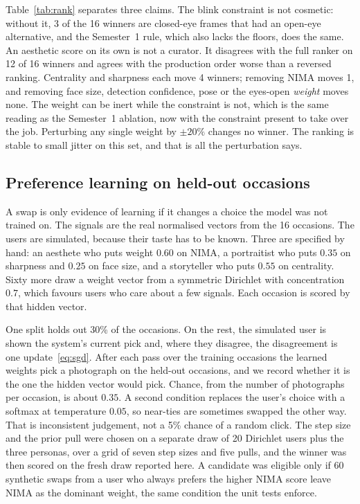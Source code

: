 \documentclass[conference]{IEEEtran}
\begin{document}
Table~\ref{tab:rank} separates three claims. The blink constraint is not
cosmetic: without it, 3 of the 16 winners are closed-eye frames that had an
open-eye alternative, and the Semester~1 rule, which also lacks the floors,
does the same. An aesthetic score on its own is not a curator. It disagrees
with the full ranker on 12 of 16 winners and agrees with the production order
worse than a reversed ranking. Centrality and sharpness each move 4 winners;
removing NIMA moves 1, and removing face size, detection confidence, pose or
the eyes-open \emph{weight} moves none. The weight can be inert while the
constraint is not, which is the same reading as the Semester~1 ablation, now
with the constraint present to take over the job. Perturbing any single weight
by $\pm 20\%$ changes no winner. The ranking is stable to small jitter on this
set, and that is all the perturbation says.

\subsection{Preference learning on held-out occasions}
\label{sec:pref-eval}

A swap is only evidence of learning if it changes a choice the model was not
trained on. The signals are the real normalised vectors from the 16 occasions.
The users are simulated, because their taste has to be known. Three are
specified by hand: an aesthete who puts weight $0.60$ on NIMA, a portraitist
who puts $0.35$ on sharpness and $0.25$ on face size, and a storyteller who
puts $0.55$ on centrality. Sixty more draw a weight vector from a symmetric
Dirichlet with concentration $0.7$, which favours users who care about a few
signals. Each occasion is scored by that hidden vector.

One split holds out 30\% of the occasions. On the rest, the simulated user is
shown the system's current pick and, where they disagree, the disagreement is
one update~\eqref{eq:sgd}. After each pass over the training occasions the
learned weights pick a photograph on the held-out occasions, and we record
whether it is the one the hidden vector would pick. Chance, from the number of
photographs per occasion, is about $0.35$. A second condition replaces the
user's choice with a softmax at temperature $0.05$, so near-ties are sometimes
swapped the other way. That is inconsistent judgement, not a 5\% chance of a
random click. The step size and the prior pull were chosen on a separate draw
of 20 Dirichlet users plus the three personas, over a grid of seven step sizes
and five pulls, and the winner was then scored on the fresh draw reported
here. A candidate was eligible only if 60 synthetic swaps from a user who
always prefers the higher NIMA score leave NIMA as the dominant weight, the
same condition the unit tests enforce.
\end{document}
